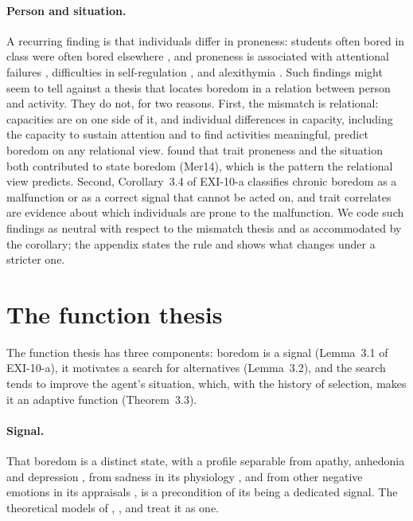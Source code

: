\documentclass{situationist-preprint}
\begin{document}
\paragraph{Person and situation.} A recurring finding is that individuals differ in proneness: students often bored in class were often bored elsewhere \citep{LarsonRichards1991}, and proneness is associated with attentional failures \citep{Malkovsky2012}, difficulties in self-regulation \citep{Struk2016,Mugon2018,Isacescu2017}, and alexithymia \citep{Eastwood2007}. Such findings might seem to tell against a thesis that locates boredom in a relation between person and activity. They do not, for two reasons. First, the mismatch is relational: capacities are on one side of it, and individual differences in capacity, including the capacity to sustain attention and to find activities meaningful, predict boredom on any relational view. \citet{MercerLynn2014} found that trait proneness and the situation both contributed to state boredom (Mer14), which is the pattern the relational view predicts. Second, Corollary~3.4 of EXI-10-a classifies chronic boredom as a malfunction or as a correct signal that cannot be acted on, and trait correlates are evidence about which individuals are prone to the malfunction. We code such findings as neutral with respect to the mismatch thesis and as accommodated by the corollary; the appendix states the rule and shows what changes under a stricter one.

\section{The function thesis}\label{s:function}

The function thesis has three components: boredom is a signal (Lemma~3.1 of EXI-10-a), it motivates a search for alternatives (Lemma~3.2), and the search tends to improve the agent's situation, which, with the history of selection, makes it an adaptive function (Theorem~3.3).

\paragraph{Signal.} That boredom is a distinct state, with a profile separable from apathy, anhedonia and depression \citep{Goldberg2011}, from sadness in its physiology \citep{MerrifieldDanckert2014}, and from other negative emotions in its appraisals \citep{vanTilburgIgou2017}, is a precondition of its being a dedicated signal. The theoretical models of \citet{Elpidorou2014,Elpidorou2018}, \citet{DanckertMugon2018}, \citet{DanckertEastwood2020} and \citet{Tam2021} treat it as one.
\end{document}
